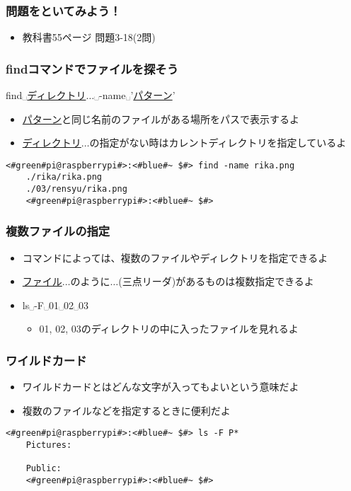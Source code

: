 \begin{frame}
    \frametitle{問題をといてみよう！}
    \begin{itemize}
        \item 教科書55ページ 問題3-18(2問)
    \end{itemize}
\end{frame}

\begin{frame}[fragile]
    \frametitle{findコマンドでファイルを探そう}
    find␣\underline{ディレクトリ}$\ldots$␣-name␣'\underline{パターン}'
    \begin{itemize}
        \item \underline{パターン}と同じ名前のファイルがある場所をパスで表示するよ
        \item \underline{ディレクトリ}$\ldots$の指定がない時はカレントディレクトリを指定しているよ
    \end{itemize}
    \begin{lstlisting}[title=rika.pngをfindコマンドで探す]
    <#green#pi@raspberrypi#>:<#blue#~ $#> find -name rika.png
    ./rika/rika.png
    ./03/rensyu/rika.png
    <#green#pi@raspberrypi#>:<#blue#~ $#>
    \end{lstlisting}
\end{frame}

\begin{frame}
    \frametitle{複数ファイルの指定}
    \begin{itemize}
        \item コマンドによっては、複数のファイルやディレクトリを指定できるよ
        \item \underline{ファイル}$\ldots$のように$\ldots$(三点リーダ)があるものは複数指定できるよ
        \item ls␣-F␣01␣02␣03
        \begin{itemize}
            \item 01, 02, 03のディレクトリの中に入ったファイルを見れるよ
        \end{itemize}
    \end{itemize}
\end{frame}

\begin{frame}[fragile]
    \frametitle{ワイルドカード}
    \begin{itemize}
        \item ワイルドカードとはどんな文字が入ってもよいという意味だよ
        \item 複数のファイルなどを指定するときに便利だよ
    \end{itemize}
    \begin{lstlisting}[title=ワイルドカードの使い方の例]
    <#green#pi@raspberrypi#>:<#blue#~ $#> ls -F P*
    Pictures:
            
    Public:
    <#green#pi@raspberrypi#>:<#blue#~ $#>
    \end{lstlisting}
\end{frame}

